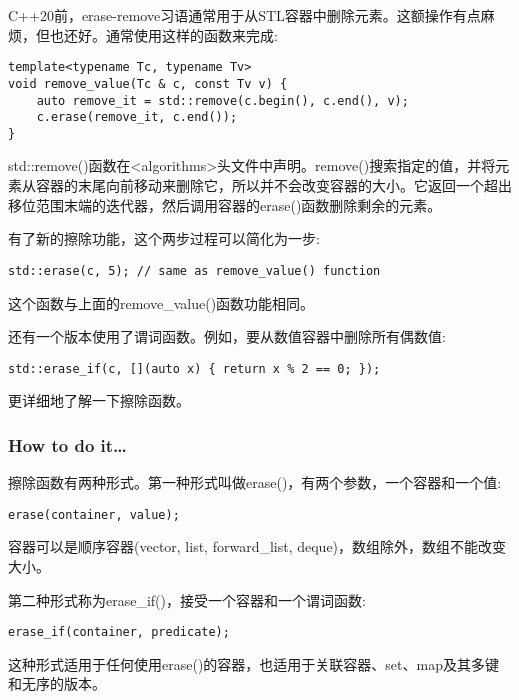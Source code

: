 
C++20前，erase-remove习语通常用于从STL容器中删除元素。这额操作有点麻烦，但也还好。通常使用这样的函数来完成:

\begin{lstlisting}[style=styleCXX]
template<typename Tc, typename Tv>
void remove_value(Tc & c, const Tv v) {
	auto remove_it = std::remove(c.begin(), c.end(), v);
	c.erase(remove_it, c.end());
}
\end{lstlisting}

std::remove()函数在<algorithms>头文件中声明。remove()搜索指定的值，并将元素从容器的末尾向前移动来删除它，所以并不会改变容器的大小。它返回一个超出移位范围末端的迭代器，然后调用容器的erase()函数删除剩余的元素。

有了新的擦除功能，这个两步过程可以简化为一步:

\begin{lstlisting}[style=styleCXX]
std::erase(c, 5); // same as remove_value() function
\end{lstlisting}

这个函数与上面的remove\_value()函数功能相同。

还有一个版本使用了谓词函数。例如，要从数值容器中删除所有偶数值:

\begin{lstlisting}[style=styleCXX]
std::erase_if(c, [](auto x) { return x % 2 == 0; });
\end{lstlisting}

更详细地了解一下擦除函数。

\subsubsection{How to do it…}

擦除函数有两种形式。第一种形式叫做erase()，有两个参数，一个容器和一个值:

\begin{lstlisting}[style=styleCXX]
erase(container, value);
\end{lstlisting}

容器可以是顺序容器(vector, list, forward\_list, deque)，数组除外，数组不能改变大小。

第二种形式称为erase\_if()，接受一个容器和一个谓词函数:

\begin{lstlisting}[style=styleCXX]
erase_if(container, predicate);
\end{lstlisting}

这种形式适用于任何使用erase()的容器，也适用于关联容器、set、map及其多键和无序的版本。

